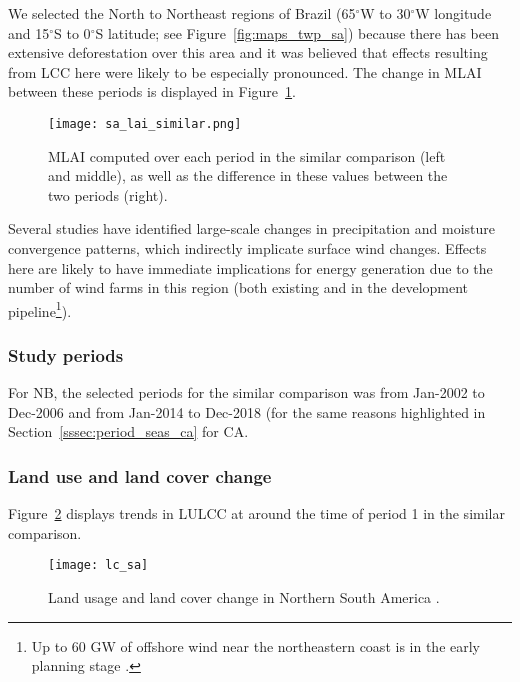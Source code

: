 We selected the North to Northeast regions of Brazil (65$^\circ$W to 30$^\circ$W longitude and 15$^\circ$S to 0$^\circ$S latitude; see Figure~\ref{fig:maps_twp_sa}) because there has been extensive deforestation over this area and it was believed that effects resulting from \ac{LCC} here were likely to be especially pronounced. The change in \ac{MLAI} between these periods is displayed in Figure~\ref{fig:sa_lai_similar}.

\begin{figure}[!ht]
	\centering
	\texttt{[image: sa\_lai\_similar.png]}
	\caption[MLAI similar comparison for NB focus region]{\ac{MLAI} computed over each period in the similar comparison (left and middle), as well as the difference in these values between the two periods (right).}
	\label{fig:sa_lai_similar}
\end{figure}

Several studies have identified large-scale changes in precipitation and moisture convergence patterns, which indirectly implicate surface wind changes. Effects here are likely to have immediate implications for energy generation due to the number of wind farms in this region (both existing and in the development pipeline\footnote{Up to 60 GW of offshore wind near the northeastern coast is in the early planning stage \citep{offshore_map}.}).

\subsubsection{Study periods}

For \ac{NB}, the selected periods for the similar comparison was from Jan-2002 to Dec-2006 and from Jan-2014 to Dec-2018 (for the same reasons highlighted in Section~\ref{sssec:period_seas_ca} for \ac{CA}.

\subsubsection{Land use and land cover change}

Figure~\ref{fig:lc_sa} displays trends in \ac{LULCC} at around the time of period 1 in the similar comparison.

\begin{figure}[!ht]
	\centering
	\texttt{[image: lc\_sa]}
	\caption[Northern Brazil Land Usage]{Land usage and land cover change in Northern South America \citep{ipcc_2007}.}
	\label{fig:lc_sa}
\end{figure}